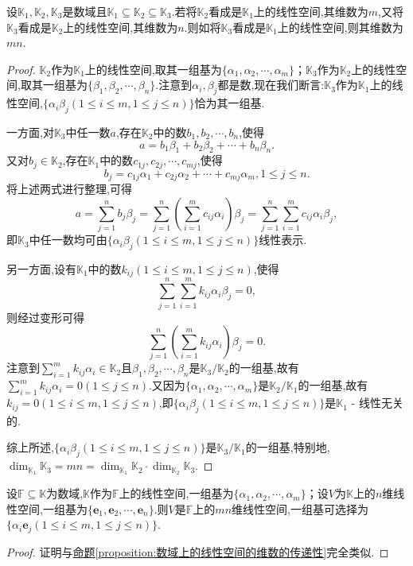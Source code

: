 \documentclass[lang=cn,newtx,10pt,scheme=chinese]{elegantbook}
\begin{document}
\begin{proposition}\label{proposition:数域上的线性空间的维数的传递性}
设\(\mathbb{K}_1,\mathbb{K}_2,\mathbb{K}_3\)是数域且\(\mathbb{K}_1\subseteq\mathbb{K}_2\subseteq\mathbb{K}_3\).若将\(\mathbb{K}_2\)看成是\(\mathbb{K}_1\)上的线性空间,其维数为\(m\),又将\(\mathbb{K}_3\)看成是\(\mathbb{K}_2\)上的线性空间,其维数为\(n\).则如将\(\mathbb{K}_3\)看成是\(\mathbb{K}_1\)上的线性空间,则其维数为\(mn\).
\end{proposition}
\begin{proof}
\(\mathbb{K}_2\)作为\(\mathbb{K}_1\)上的线性空间,取其一组基为\(\{\alpha_1,\alpha_2,\cdots,\alpha_m\}\)；\(\mathbb{K}_3\)作为\(\mathbb{K}_2\)上的线性空间,取其一组基为\(\{\beta_1,\beta_2,\cdots,\beta_n\}\).注意到\(\alpha_i,\beta_j\)都是数,现在我们断言:\(\mathbb{K}_3\)作为\(\mathbb{K}_1\)上的线性空间,\(\{\alpha_i\beta_j(1\leq i\leq m,1\leq j\leq n)\}\)恰为其一组基.

一方面,对\(\mathbb{K}_3\)中任一数\(a\),存在\(\mathbb{K}_2\)中的数\(b_1,b_2,\cdots,b_n\),使得
\[
a = b_1\beta_1 + b_2\beta_2+\cdots + b_n\beta_n.
\]
又对\(b_j\in\mathbb{K}_2\),存在\(\mathbb{K}_1\)中的数\(c_{1j},c_{2j},\cdots,c_{mj}\),使得
\[
b_j = c_{1j}\alpha_1 + c_{2j}\alpha_2+\cdots + c_{mj}\alpha_m,1\leq j\leq n.
\]
将上述两式进行整理,可得
\[
a=\sum_{j = 1}^{n}b_j\beta_j=\sum_{j = 1}^{n}\left(\sum_{i = 1}^{m}c_{ij}\alpha_i\right)\beta_j=\sum_{j = 1}^{n}\sum_{i = 1}^{m}c_{ij}\alpha_i\beta_j,
\]
即\(\mathbb{K}_3\)中任一数均可由\(\{\alpha_i\beta_j(1\leq i\leq m,1\leq j\leq n)\}\)线性表示.

另一方面,设有\(\mathbb{K}_1\)中的数\(k_{ij}(1\leq i\leq m,1\leq j\leq n)\),使得
\[
\sum_{j = 1}^{n}\sum_{i = 1}^{m}k_{ij}\alpha_i\beta_j = 0,
\]
则经过变形可得
\[
\sum_{j = 1}^{n}\left(\sum_{i = 1}^{m}k_{ij}\alpha_i\right)\beta_j = 0.
\]
注意到\(\sum_{i = 1}^{m}k_{ij}\alpha_i\in\mathbb{K}_2\)且\(\beta_1,\beta_2,\cdots,\beta_n\)是\(\mathbb{K}_3/\mathbb{K}_2\)的一组基,故有\(\sum_{i = 1}^{m}k_{ij}\alpha_i = 0(1\leq j\leq n)\).又因为\(\{\alpha_1,\alpha_2,\cdots,\alpha_m\}\)是\(\mathbb{K}_2/\mathbb{K}_1\)的一组基,故有\(k_{ij}=0(1\leq i\leq m,1\leq j\leq n)\),即\(\{\alpha_i\beta_j(1\leq i\leq m,1\leq j\leq n)\}\)是\(\mathbb{K}_1\) - 线性无关的.

综上所述,\(\{\alpha_i\beta_j(1\leq i\leq m,1\leq j\leq n)\}\)是\(\mathbb{K}_3/\mathbb{K}_1\)的一组基,特别地,\(\dim_{\mathbb{K}_1}\mathbb{K}_3=mn=\dim_{\mathbb{K}_1}\mathbb{K}_2\cdot\dim_{\mathbb{K}_2}\mathbb{K}_3\).
\end{proof}

\begin{proposition}\label{proposition:数域上的线性空间的基的传递性}
设\(\mathbb{F}\subseteq\mathbb{K}\)为数域,\(\mathbb{K}\)作为\(\mathbb{F}\)上的线性空间,一组基为\(\{\alpha_1,\alpha_2,\cdots,\alpha_m\}\)；设\(V\)为\(\mathbb{K}\)上的\(n\)维线性空间,一组基为\(\{\boldsymbol{e}_1,\boldsymbol{e}_2,\cdots,\boldsymbol{e}_n\}\).则\(V\)是\(\mathbb{F}\)上的\(mn\)维线性空间,一组基可选择为\(\{\alpha_i\boldsymbol{e}_j(1\leq i\leq m,1\leq j\leq n)\}\).
\end{proposition}
\begin{proof}
证明与\hyperref[proposition:数域上的线性空间的维数的传递性]{命题\ref{proposition:数域上的线性空间的维数的传递性}}完全类似.
\end{proof}
\end{document}
